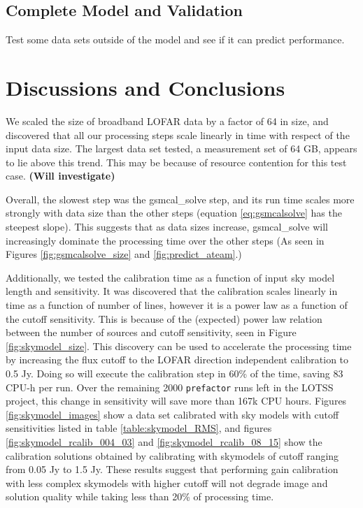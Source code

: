\documentclass[preprint,5p]{elsarticle}
\begin{document}
\subsection{Complete Model and Validation}
Test some data sets outside of the model and see if it can predict performance. 


\section{Discussions and Conclusions}\label{sec:discussions}

We scaled the size of broadband LOFAR data by a factor of 64 in size, and discovered that all our processing steps scale linearly in time with respect of the input data size. The largest data set tested, a measurement set of 64 GB, appears to lie above this trend. This may be because of resource contention for this test case. \textbf{(Will investigate)}

Overall, the slowest step was the gsmcal\_solve step, and its run time scales more strongly with data size than the other steps (equation \ref{eq:gsmcalsolve} has the steepest slope). This suggests that as data sizes increase, gsmcal\_solve will increasingly dominate the processing time over the other steps (As seen in Figures \ref{fig:gsmcalsolve_size} and \ref{fig:predict_ateam}.)

Additionally, we tested the calibration time as a function of input sky model length and sensitivity. It was discovered that the calibration scales linearly in time as a function of number of lines, however it is a power law as a function of the cutoff sensitivity. This is because of the (expected) power law relation between the number of sources and cutoff sensitivity, seen in Figure \ref{fig:skymodel_size}. This discovery can be used to accelerate the processing time by increasing the flux cutoff to the LOFAR direction independent calibration to 0.5 Jy. Doing so will execute the calibration step in 60\% of the time, saving 83 CPU-h per run. Over the remaining 2000 \texttt{prefactor} runs left in the LOTSS project, this change in sensitivity will save more than 167k CPU hours. Figures \ref{fig:skymodel_images} show a data set calibrated with sky models with cutoff sensitivities listed in table \ref{table:skymodel_RMS}, and figures  \ref{fig:skymodel_rcalib_004_03} and \ref{fig:skymodel_rcalib_08_15} show the calibration solutions obtained by calibrating with skymodels of cutoff ranging from 0.05 Jy to 1.5 Jy. These results suggest that performing gain calibration with less complex skymodels with higher cutoff will not degrade image and solution quality while taking less than 20\% of processing time. 
\end{document}
